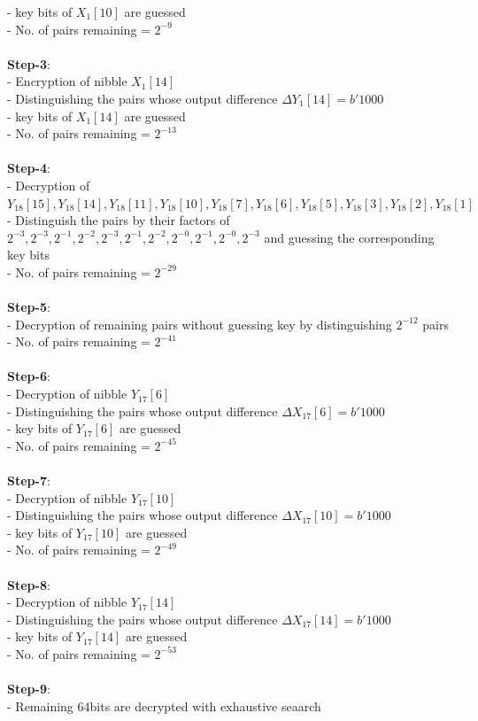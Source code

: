 \documentclass{transcrypto}
\begin{document}
	- key bits of $ X_1[10] $ are guessed\\
	- No. of pairs remaining = $ 2^{-9} $\\ \\
	\textbf{Step-3}: \\
	- Encryption of nibble $ X_1[14] $\\
	- Distinguishing the pairs whose output difference $ \Delta Y_1[14] = b'1000 $\\
	- key bits of $ X_1[14] $ are guessed\\
	- No. of pairs remaining = $ 2^{-13} $\\ \\
	\textbf{Step-4}:\\
	- Decryption of $ Y_{18}[15],Y_{18}[14],Y_{18}[11],Y_{18}[10],Y_{18}[7],Y_{18}[6],Y_{18}[5],Y_{18}[3],Y_{18}[2],Y_{18}[1] $\\
	- Distinguish the pairs by their factors of $ 2^{-3},2^{-3},2^{-1},2^{-2},2^{-3},2^{-1},2^{-2},2^{-0},2^{-1},2^{-0},2^{-3} $ and guessing the corresponding key bits\\
	- No. of pairs remaining = $ 2^{-29} $\\ \\
	\textbf{Step-5}:\\
	- Decryption of remaining pairs without guessing key by distinguishing $ 2^{-12} $ pairs\\
	- No. of pairs remaining = $ 2^{-41} $\\ \\
	\textbf{Step-6}:\\
	- Decryption of nibble $ Y_{17}[6] $\\
	- Distinguishing the pairs whose output difference $ \Delta X_{17}[6] = b'1000 $\\
	- key bits of $ Y_{17}[6] $ are guessed\\
	- No. of pairs remaining = $ 2^{-45} $\\ \\
	\textbf{Step-7}:\\
	- Decryption of nibble $ Y_{17}[10] $\\
	- Distinguishing the pairs whose output difference $ \Delta X_{17}[10] = b'1000 $\\
	- key bits of $ Y_{17}[10] $ are guessed\\
	- No. of pairs remaining = $ 2^{-49} $\\ \\
	\textbf{Step-8}:\\
	- Decryption of nibble $ Y_{17}[14] $\\
	- Distinguishing the pairs whose output difference $ \Delta X_{17}[14] = b'1000 $\\
	- key bits of $ Y_{17}[14] $ are guessed\\
	- No. of pairs remaining = $ 2^{-53} $\\ \\
	\textbf{Step-9}:\\
	- Remaining 64bits are decrypted with exhaustive seaarch\\ \\
	
\end{document}
